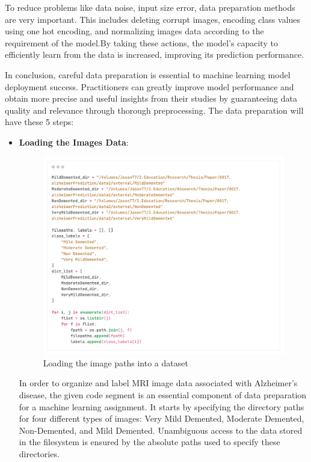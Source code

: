 \documentclass[12pt,onecolumn]{report}
\begin{document}
To reduce problems like data noise, input size error, data preparation methods are very important. This includes deleting corrupt images, encoding class values using one hot encoding, and normalizing images data according to the requirement of the model.By taking these actions, the model's capacity to efficiently learn from the data is increased, improving its prediction performance. 

In conclusion, careful data preparation is essential to machine learning model deployment success. Practitioners can greatly improve model performance and obtain more precise and useful insights from their studies by guaranteeing data quality and relevance through thorough preprocessing. The data preparation will have these 5 steps:
\begin{itemize}
    \item \textbf{Loading the Images Data}:
    \begin{figure}[h!]
        \centering
        \includegraphics[width=1.0\columnwidth]{figures/loading_images.png}  %
        \caption{Loading the image paths into a dataset} %
        \label{fig:loading image paths a dataset} %
    \end{figure}
    In order to organize and label MRI image data associated with Alzheimer's disease, the given code segment is an essential component of data preparation for a machine learning assignment. It starts by specifying the directory paths for four different types of images: Very Mild Demented, Moderate Demented, Non-Demented, and Mild Demented. Unambiguous access to the data stored in the filesystem is ensured by the absolute paths used to specify these directories.


\end{itemize}
\end{document}
